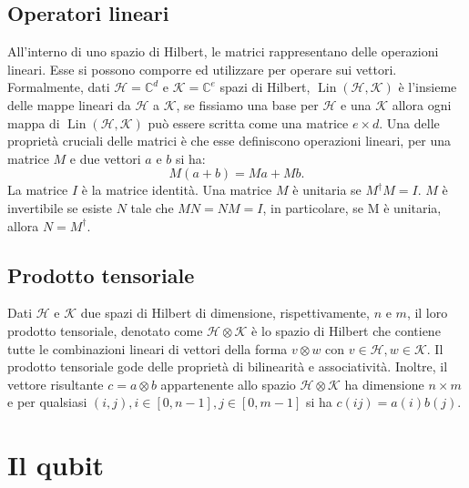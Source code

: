 \subsection{Operatori lineari}
All'interno di uno spazio di Hilbert, le matrici rappresentano delle operazioni lineari. Esse si possono comporre ed utilizzare per operare sui vettori. Formalmente, dati $\mathcal{H} = \mathbb{C}^d$ e $\mathcal{K} = \mathbb{C}^e$ spazi di Hilbert, $\operatorname{Lin}(\mathcal{H}, \mathcal{K})$ è l'insieme delle mappe lineari da $\mathcal{H}$ a $\mathcal{K}$, se fissiamo una base per $\mathcal{H}$ e una $\mathcal{K}$ allora ogni mappa di $\operatorname{Lin}(\mathcal{H}, \mathcal{K})$ può essere scritta come una matrice $e \times d$. Una delle proprietà cruciali delle matrici è che esse definiscono operazioni lineari, per una matrice $M$ e due vettori $a$ e $b$ si ha:
\begin{equation}
  M(a + b) = Ma + Mb.
\end{equation}
La matrice $I$ è la matrice identità. Una matrice $M$ è unitaria se $M^\dagger M = I$. $M$ è invertibile se esiste $N$ tale che $MN=NM=I$, in particolare, se M è unitaria, allora $N = M^\dagger$.

\subsection{Prodotto tensoriale}
Dati $\mathcal{H}$ e $\mathcal{K}$ due spazi di Hilbert di dimensione, rispettivamente, $n$ e $m$, il loro prodotto tensoriale, denotato come $\mathcal{H} \otimes \mathcal{K}$ è lo spazio di Hilbert che contiene tutte le combinazioni lineari di vettori della forma $v \otimes w$ con $v \in \mathcal{H}, w \in \mathcal{K}$. Il prodotto tensoriale gode delle proprietà di bilinearità e associatività. Inoltre, il vettore risultante $c = a \otimes b$ appartenente allo spazio $\mathcal{H} \otimes \mathcal{K}$ ha dimensione $n \times m$ e per qualsiasi $(i, j), i \in [0, n - 1], j \in [0, m - 1]$ si ha $c(ij) = a(i)b(j)$.

\section{Il qubit \label{sec:qubit}}
